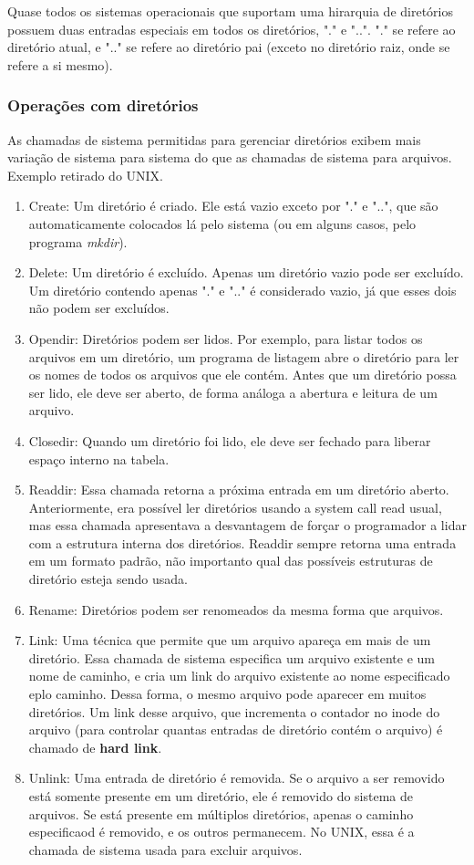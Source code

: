 \documentclass[10pt]{article}
\begin{document}
Quase todos os sistemas operacionais que suportam uma hirarquia de diretórios possuem duas entradas
especiais em todos os diretórios, "." e "..". "." se refere ao diretório atual, e ".." se refere ao
diretório pai (exceto no diretório raiz, onde se refere a si mesmo).

\subsubsection{Operações com diretórios}

As chamadas de sistema permitidas para gerenciar diretórios exibem mais variação de sistema para
sistema do que as chamadas de sistema para arquivos. Exemplo retirado do UNIX.
\begin{enumerate}
    \item Create: Um diretório é criado. Ele está vazio exceto por "." e "..", que são automaticamente
    colocados lá pelo sistema (ou em alguns casos, pelo programa \textit{mkdir}).
    \item Delete: Um diretório é excluído. Apenas um diretório vazio pode ser excluído. Um diretório contendo
    apenas "." e ".." é considerado vazio, já que esses dois não podem ser excluídos.
    \item Opendir: Diretórios podem ser lidos. Por exemplo, para listar todos os arquivos em um diretório, um 
    programa de listagem abre o diretório para ler os nomes de todos os arquivos que ele contém. Antes que
    um diretório possa ser lido, ele deve ser aberto, de forma análoga a abertura e leitura de um arquivo.
    \item Closedir: Quando um diretório foi lido, ele deve ser fechado para liberar espaço interno na tabela.
    \item Readdir: Essa chamada retorna a próxima entrada em um diretório aberto. Anteriormente, era possível ler
    diretórios usando a system call read usual, mas essa chamada apresentava a desvantagem de forçar o programador
    a lidar com a estrutura interna dos diretórios. Readdir sempre retorna uma entrada em um formato padrão, não
    importanto qual das possíveis  estruturas de diretório esteja sendo usada.
    \item Rename: Diretórios podem ser renomeados da mesma forma que arquivos.
    \item Link: Uma técnica que permite que um arquivo apareça em mais de um diretório. Essa chamada de sistema
    especifica um arquivo existente e um nome de caminho, e cria um link do arquivo existente ao nome especificado
    eplo caminho. Dessa forma, o mesmo arquivo pode aparecer em muitos diretórios. Um link desse arquivo, que incrementa
    o contador no inode do arquivo (para controlar quantas entradas de diretório contém o arquivo) é chamado de 
    \textbf{hard link}.
    \item Unlink: Uma entrada de diretório é removida. Se o arquivo a ser removido está somente presente em um diretório,
    ele é removido do sistema de arquivos. Se está presente em múltiplos diretórios, apenas o caminho especificaod é removido,
    e os outros permanecem. No UNIX, essa é a chamada de sistema usada para excluir arquivos.
\end{enumerate}
\end{document}
